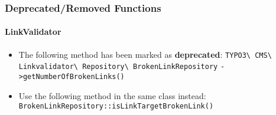 %
%
%
%
%
%
%
%
%

\begin{frame}[fragile]
	\frametitle{Deprecated/Removed Functions}
	\framesubtitle{LinkValidator}

	\begin{itemize}
		\item The following method has been marked as \textbf{deprecated}:
		\newline\newline
			\smaller
				\texttt{TYPO3\textbackslash
					CMS\textbackslash
					Linkvalidator\textbackslash
					Repository\textbackslash
					BrokenLinkRepository}\newline
				\texttt{->getNumberOfBrokenLinks()}\normalsize\newline

		\item Use the following method in the same class instead:\newline
			\small\texttt{BrokenLinkRepository::isLinkTargetBrokenLink()}\normalsize

	\end{itemize}

\end{frame}


